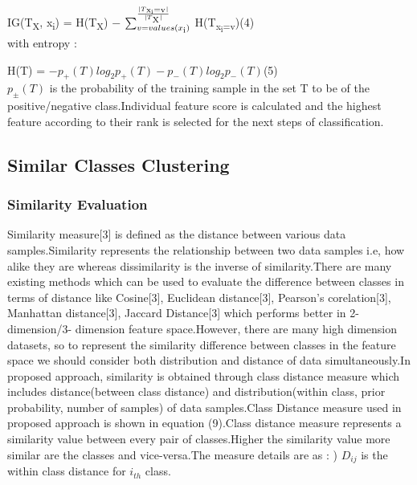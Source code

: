 \documentclass[a4paper, 10pt, conference]{ieeeconf}      %
\begin{document}
\hspace{1cm}IG(T\textsubscript{X}, x\textsubscript{i}) = H(T\textsubscript{X}) − $  \sum_{v=values(x\textsubscript{i})}^\frac{|T\textsubscript{x\textsubscript{i}=v}|}{|T\textsubscript{X}|}$ H(T\textsubscript{x\textsubscript{i}=v})\hspace{0.5cm}(4)\\ 
with entropy :
\newline
\par
\hspace{1cm}H(T) = $−p_{+}(T) log_{2} p_{+}(T) − p_{−}(T) log_{2} p_{−}(T)$\hspace{1.25cm}(5)\\
\newline
$p_{±}(T)$ is the probability of the training sample in the set T to be of the positive/negative class.Individual feature score is calculated and the highest feature according to their rank is selected for the next steps of classification.

\subsection{Similar Classes Clustering}

\subsubsection{Similarity Evaluation}
Similarity measure[3] is defined as the distance between various data samples.Similarity represents the relationship between two data samples i.e, how alike they are whereas dissimilarity is the inverse of similarity.There are many existing methods which can be used to evaluate the difference between classes in terms of distance like Cosine[3], Euclidean distance[3], Pearson's corelation[3], Manhattan distance[3], Jaccard Distance[3] which performs better in 2-dimension/3- dimension feature space.However, there are many high dimension datasets, so to represent the similarity difference between classes in the feature space we should consider both distribution and distance of data simultaneously.In proposed approach, similarity is obtained through class distance measure which includes distance(between class distance) and distribution(within class, prior probability, number of samples) of data samples.Class Distance measure used in proposed approach is shown in equation (9).Class distance measure represents a similarity value between every pair of classes.Higher the similarity value more similar are the classes and vice-versa.The measure details are as : 
) $D_{ij}$ is the within class distance for $i_{th}$ class.
\end{document}
